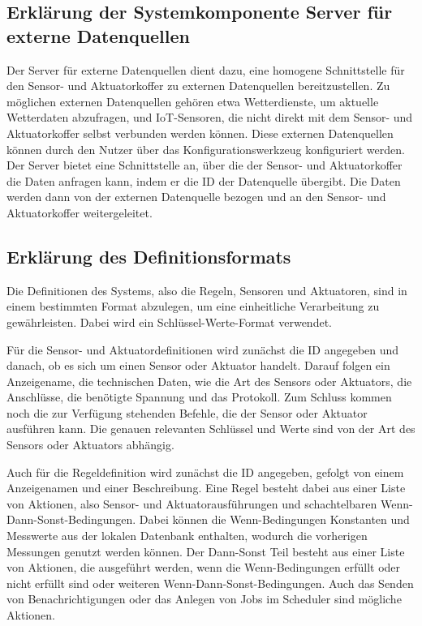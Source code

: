 \subsection{Erklärung der Systemkomponente Server für externe Datenquellen}
Der Server für externe Datenquellen dient dazu, eine homogene Schnittstelle für den Sensor- und Aktuatorkoffer zu externen Datenquellen bereitzustellen.
Zu möglichen externen Datenquellen gehören etwa Wetterdienste, um aktuelle Wetterdaten abzufragen, und IoT-Sensoren, die nicht direkt mit dem Sensor- und Aktuatorkoffer selbst verbunden werden können.
Diese externen Datenquellen können durch den Nutzer über das Konfigurationswerkzeug konfiguriert werden.
Der Server bietet eine Schnittstelle an, über die der Sensor- und Aktuatorkoffer die Daten anfragen kann, indem er die ID der Datenquelle übergibt.
Die Daten werden dann von der externen Datenquelle bezogen und an den Sensor- und Aktuatorkoffer weitergeleitet.


\subsection{Erklärung des Definitionsformats}\label{sec:definitionsformat}
Die Definitionen des Systems, also die Regeln, Sensoren und Aktuatoren, sind in einem bestimmten Format abzulegen, um eine einheitliche Verarbeitung zu gewährleisten.
Dabei wird ein Schlüssel-Werte-Format verwendet.

Für die Sensor- und Aktuatordefinitionen wird zunächst die ID angegeben und danach, ob es sich um einen Sensor oder Aktuator handelt.
Darauf folgen ein Anzeigename, die technischen Daten, wie die Art des Sensors oder Aktuators, die Anschlüsse, die benötigte Spannung und das Protokoll.
Zum Schluss kommen noch die zur Verfügung stehenden Befehle, die der Sensor oder Aktuator ausführen kann.
Die genauen relevanten Schlüssel und Werte sind von der Art des Sensors oder Aktuators abhängig.

Auch für die Regeldefinition wird zunächst die ID angegeben, gefolgt von einem Anzeigenamen und einer Beschreibung.
Eine Regel besteht dabei aus einer Liste von Aktionen, also Sensor- und Aktuatorausführungen und schachtelbaren Wenn-Dann-Sonst-Bedingungen.
Dabei können die Wenn-Bedingungen Konstanten und Messwerte aus der lokalen Datenbank enthalten, wodurch die vorherigen Messungen genutzt werden können.
Der Dann-Sonst Teil besteht aus einer Liste von Aktionen, die ausgeführt werden, wenn die Wenn-Bedingungen erfüllt oder nicht erfüllt sind oder weiteren Wenn-Dann-Sonst-Bedingungen.
Auch das Senden von Benachrichtigungen oder das Anlegen von Jobs im Scheduler sind mögliche Aktionen.


